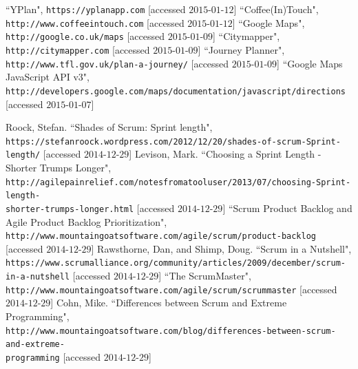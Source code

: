 \documentclass[a4paper, 10pt]{report}
\begin{document}
\begin{appendices}
\begin{thebibliography}{99}
 ``YPlan", \texttt{https://yplanapp.com} [accessed $\text{2015-01-12}$]
 ``Coffee(In)Touch", \texttt{http://www.coffeeintouch.com} [accessed $\text{2015-01-12}$]
 ``Google Maps", \texttt{http://google.co.uk/maps} [accessed $\text{2015-01-09}$]
 ``Citymapper", \texttt{http://citymapper.com} [accessed $\text{2015-01-09}$]
 ``Journey Planner", \texttt{http://www.tfl.gov.uk/plan-a-journey/} [accessed $\text{2015-01-09}$]
``Google Maps JavaScript API v3",\\
\texttt{http://developers.google.com/maps/documentation/javascript/directions}
[accessed $\text{2015-01-07}$]

Roock, Stefan. ``Shades of Scrum: Sprint length",\\ \texttt{https://stefanroock.wordpress.com/2012/12/20/shades-of-scrum-Sprint-length/} [accessed $\text{2014-12-29}$]
Levison, Mark. ``Choosing a Sprint Length - Shorter Trumps Longer",\\
\texttt{http://agilepainrelief.com/notesfromatooluser/2013/07/choosing-Sprint-length-\\shorter-trumps-longer.html} [accessed $\text{2014-12-29}$]
 ``Scrum Product Backlog and Agile Product Backlog Prioritization",\\
\texttt{http://www.mountaingoatsoftware.com/agile/scrum/product-backlog} [accessed $\text{2014-12-29}$]
 Rawsthorne, Dan, and Shimp, Doug. ``Scrum in a Nutshell",\\
\texttt{https://www.scrumalliance.org/community/articles/2009/december/scrum-in-a-nutshell} [accessed $\text{2014-12-29}$]
``The ScrumMaster",\\
\texttt{http://www.mountaingoatsoftware.com/agile/scrum/scrummaster}
[accessed $\text{2014-12-29}$]
Cohn, Mike. ``Differences between Scrum and Extreme Programming",\\
\texttt{http://www.mountaingoatsoftware.com/blog/differences-between-scrum-and-extreme-\\programming} [accessed $\text{2014-12-29}$]


\end{thebibliography}
\end{appendices}
\end{document}
